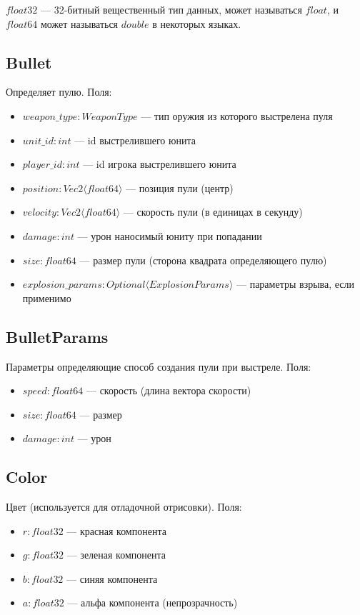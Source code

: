 $float32$ --- 32-битный вещественный тип данных, может называться $float$, и $float64$ может называться $double$ в некоторых языках.

\subsection{Bullet}
Определяет пулю. Поля:
\begin{itemize}
    \item $weapon\_type : WeaponType$ --- тип оружия из которого выстрелена пуля
    \item $unit\_id : int$ --- id выстрелившего юнита
    \item $player\_id : int$ --- id игрока выстрелившего юнита
    \item $position : Vec2 \langle float64 \rangle$ --- позиция пули (центр)
    \item $velocity : Vec2 \langle float64 \rangle$ --- скорость пули (в единицах в секунду)
    \item $damage : int$ --- урон наносимый юниту при попадании
    \item $size : float64$ --- размер пули (сторона квадрата определяющего пулю)
    \item $explosion\_params : Optional \langle ExplosionParams \rangle$ --- параметры взрыва, если применимо
\end{itemize}

\subsection{BulletParams}
Параметры определяющие способ создания пули при выстреле. Поля:
\begin{itemize}
    \item $speed : float64$ --- скорость (длина вектора скорости)
    \item $size : float64$ --- размер
    \item $damage : int$ --- урон
\end{itemize}

\subsection{Color}
Цвет (используется для отладочной отрисовки). Поля:
\begin{itemize}
    \item $r : float32$ --- красная компонента
    \item $g : float32$ --- зеленая компонента
    \item $b : float32$ --- синяя компонента
    \item $a : float32$ --- альфа компонента (непрозрачность)
\end{itemize}

